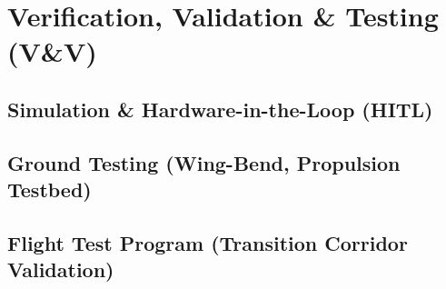 ﻿\chapter{Verification, Validation \& Testing (V\&V)}
\label{ch:testing}
\section{Simulation \& Hardware-in-the-Loop (HITL)}
\section{Ground Testing (Wing-Bend, Propulsion Testbed)}
\section{Flight Test Program (Transition Corridor Validation)}
